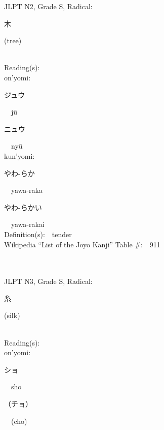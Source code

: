 \begin{multicols}{2}
{JLPT N2, Grade S, Radical:\ \ {\begin{CJK}{UTF8}{min} 木 \end{CJK}} (tree) } \\
Reading(s):\ \ \\
{\hspace*{1em}}on'yomi:\ \ \\
{\hspace*{2em}}{\begin{CJK}{UTF8}{min} ジュウ \end{CJK}}\ \ j\=u\ \ \\
{\hspace*{2em}}{\begin{CJK}{UTF8}{min} ニュウ \end{CJK}}\ \ ny\=u\ \ \\
{\hspace*{1em}}kun'yomi:\ \ \\
{\hspace*{2em}}{\begin{CJK}{UTF8}{min} やわ-らか \end{CJK}}\ \ yawa-raka\ \ \\
{\hspace*{2em}}{\begin{CJK}{UTF8}{min} やわ-らかい \end{CJK}}\ \ yawa-rakai\ \ \\
Definition(s):\ \ tender \\
Wikipedia ``List of the J\=oy\=o Kanji'' Table \#:\ \ 911 \\
\ \ \\
{\fontsize{34pt}{40pt}  }\ \ \\  %
{JLPT N3, Grade S, Radical:\ \ {\begin{CJK}{UTF8}{min} 糸 \end{CJK}} (silk) } \\
Reading(s):\ \ \\
{\hspace*{1em}}on'yomi:\ \ \\
{\hspace*{2em}}{\begin{CJK}{UTF8}{min} ショ \end{CJK}}\ \ sho\ \ \\
{\hspace*{2em}}{\begin{CJK}{UTF8}{min} （チョ） \end{CJK}}\ \ (cho)\ \ \\

\end{multicols}
